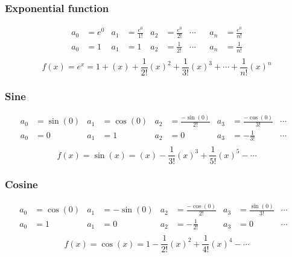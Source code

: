 \documentclass[11pt, a4paper]{article}
\begin{document}
\subsubsection*{Exponential function}
\vspace{-.8cm}
\begin{align*}
a_{0}&=e^{0} & a_{1}&=\frac{e^{0}}{1!} & a_{2}&=\frac{e^{0}}{2!} & \cdots& & a_{n}&=\frac{e^{0}}{n!} \\
a_{0}&=1 & a_{1}&=1 & a_{2}&=\frac{1}{2!} & \cdots& & a_{n}&=\frac{1}{n!} \\
\end{align*}
\begin{equation*}
f(x)=e^{x}=1+(x)+\frac{1}{2!}(x)^{2}+\frac{1}{3!}(x)^{3}+\cdots+\frac{1}{n!}(x)^{n}
\end{equation*} \newline
\subsubsection*{Sine}
\vspace{-.8cm}
\begin{align*}
a_{0}&=\sin(0) & a_{1}&=\cos(0) & a_{2}&=\frac{-\sin(0)}{2!} & a_{3}&=\frac{-\cos(0)}{3!}& \cdots& \\
a_{0}&=0 & a_{1}&=1 & a_{2}&=0 & a_{3}&=-\frac{1}{3!} & \cdots& \\
\end{align*}
\begin{equation*}
f(x)=\sin(x)=(x)-\frac{1}{3!}(x)^{3}+\frac{1}{5!}(x)^{5}-\cdots
\end{equation*} \newline
\subsubsection*{Cosine}
\vspace{-.8cm}
\begin{align*}
a_{0}&=\cos(0) & a_{1}&=-\sin(0) & a_{2}&=\frac{-\cos(0)}{2!} & a_{3}&=\frac{\sin(0)}{3!}& \cdots& \\
a_{0}&=1 & a_{1}&=0 & a_{2}&=-\frac{1}{2!} & a_{3}&=0 & \cdots& \\
\end{align*}
\begin{equation*}
f(x)=\cos(x)=1-\frac{1}{2!}(x)^{2}+\frac{1}{4!}(x)^{4}-\cdots
\end{equation*} \newline
\end{document}
